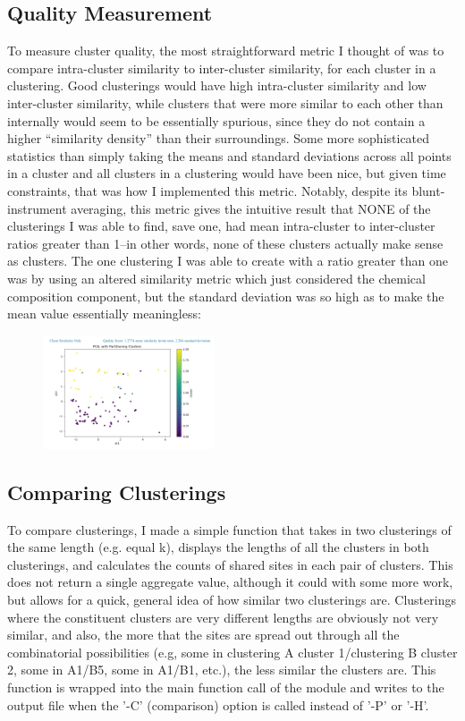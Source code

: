 \documentclass{article}
\begin{document}
\subsection{Quality Measurement}
To measure cluster quality, the most straightforward metric I thought of was to compare intra-cluster similarity to inter-cluster similarity, for each cluster in a clustering. Good clusterings would have high intra-cluster similarity and low inter-cluster similarity, while clusters that were more similar to each other than internally would seem to be essentially spurious, since they do not contain a higher ``similarity density'' than their surroundings. Some more sophisticated statistics than simply taking the means and standard deviations across all points in a cluster and all clusters in a clustering would have been nice, but given time constraints, that was how I implemented this metric. Notably, despite its blunt-instrument averaging, this metric gives the intuitive result that NONE of the clusterings I was able to find, save one, had mean intra-cluster to inter-cluster ratios greater than 1--in other words, none of these clusters actually make sense as clusters. The one clustering I was able to create with a ratio greater than one was by using an altered similarity metric which just considered the chemical composition component, but the standard deviation was so high as to make the mean value essentially meaningless:
\begin{figure}[h]
\centering
\includegraphics[width=0.45\textwidth]{./unicorn.png}
\end{figure}
\subsection{Comparing Clusterings}
To compare clusterings, I made a simple function that takes in two clusterings of the same length (e.g. equal k), displays the lengths of all the clusters in both clusterings, and calculates the counts of shared sites in each pair of clusters. This does not return a single aggregate value, although it could with some more work, but allows for a quick, general idea of how similar two clusterings are. Clusterings where the constituent clusters are very different lengths are obviously not very similar, and also, the more that the sites are spread out through all the combinatorial possibilities (e.g, some in clustering A cluster 1/clustering B cluster 2, some in A1/B5, some in A1/B1, etc.), the less similar the clusters are. This function is wrapped into the main function call of the module and writes to the output file when the '-C' (comparison) option is called instead of '-P' or '-H'.
\end{document}
